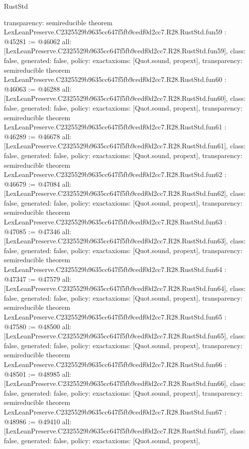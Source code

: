 \begin{lexlean}{RustStd}
\begin{coremodule}
{  transparency: semireducible
}
theorem LexLeanPreserve.C2325529b9635cc647f5fb9cedf0d2cc7.R28.RustStd.fun59 : @45281 := @46062 {
  all: [LexLeanPreserve.C2325529b9635cc647f5fb9cedf0d2cc7.R28.RustStd.fun59],
  class: false,
  generated: false,
  policy: exact{axioms: [Quot.sound, propext]},
  transparency: semireducible
}
theorem LexLeanPreserve.C2325529b9635cc647f5fb9cedf0d2cc7.R28.RustStd.fun60 : @46063 := @46288 {
  all: [LexLeanPreserve.C2325529b9635cc647f5fb9cedf0d2cc7.R28.RustStd.fun60],
  class: false,
  generated: false,
  policy: exact{axioms: [Quot.sound, propext]},
  transparency: semireducible
}
theorem LexLeanPreserve.C2325529b9635cc647f5fb9cedf0d2cc7.R28.RustStd.fun61 : @46289 := @46678 {
  all: [LexLeanPreserve.C2325529b9635cc647f5fb9cedf0d2cc7.R28.RustStd.fun61],
  class: false,
  generated: false,
  policy: exact{axioms: [Quot.sound, propext]},
  transparency: semireducible
}
theorem LexLeanPreserve.C2325529b9635cc647f5fb9cedf0d2cc7.R28.RustStd.fun62 : @46679 := @47084 {
  all: [LexLeanPreserve.C2325529b9635cc647f5fb9cedf0d2cc7.R28.RustStd.fun62],
  class: false,
  generated: false,
  policy: exact{axioms: [Quot.sound, propext]},
  transparency: semireducible
}
theorem LexLeanPreserve.C2325529b9635cc647f5fb9cedf0d2cc7.R28.RustStd.fun63 : @47085 := @47346 {
  all: [LexLeanPreserve.C2325529b9635cc647f5fb9cedf0d2cc7.R28.RustStd.fun63],
  class: false,
  generated: false,
  policy: exact{axioms: [Quot.sound, propext]},
  transparency: semireducible
}
theorem LexLeanPreserve.C2325529b9635cc647f5fb9cedf0d2cc7.R28.RustStd.fun64 : @47347 := @47579 {
  all: [LexLeanPreserve.C2325529b9635cc647f5fb9cedf0d2cc7.R28.RustStd.fun64],
  class: false,
  generated: false,
  policy: exact{axioms: [Quot.sound, propext]},
  transparency: semireducible
}
theorem LexLeanPreserve.C2325529b9635cc647f5fb9cedf0d2cc7.R28.RustStd.fun65 : @47580 := @48500 {
  all: [LexLeanPreserve.C2325529b9635cc647f5fb9cedf0d2cc7.R28.RustStd.fun65],
  class: false,
  generated: false,
  policy: exact{axioms: [Quot.sound, propext]},
  transparency: semireducible
}
theorem LexLeanPreserve.C2325529b9635cc647f5fb9cedf0d2cc7.R28.RustStd.fun66 : @48501 := @48985 {
  all: [LexLeanPreserve.C2325529b9635cc647f5fb9cedf0d2cc7.R28.RustStd.fun66],
  class: false,
  generated: false,
  policy: exact{axioms: [Quot.sound, propext]},
  transparency: semireducible
}
theorem LexLeanPreserve.C2325529b9635cc647f5fb9cedf0d2cc7.R28.RustStd.fun67 : @48986 := @49410 {
  all: [LexLeanPreserve.C2325529b9635cc647f5fb9cedf0d2cc7.R28.RustStd.fun67],
  class: false,
  generated: false,
  policy: exact{axioms: [Quot.sound, propext]},
}
\end{coremodule}
\end{lexlean}
